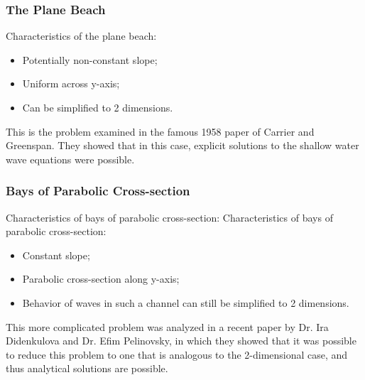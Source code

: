 	\begin{frame}
	\frametitle{The Plane Beach}
		Characteristics of the plane beach:
		\begin{itemize}
			\item Potentially non-constant slope;
			\item Uniform across y-axis;
			\item Can be simplified to 2 dimensions.
		\end{itemize}
		This is the problem examined in the famous 1958 paper of Carrier and Greenspan. They showed that in this case, explicit solutions to the shallow water wave equations were possible.
	\end{frame}


	\begin{frame}
		\frametitle{Bays of Parabolic Cross-section}
		Characteristics of bays of parabolic cross-section:
		Characteristics of bays of parabolic cross-section:
		\begin{itemize}
			\item Constant slope;
			\item Parabolic cross-section along y-axis;
			\item Behavior of waves in such a channel can still be simplified to 2 dimensions.
		\end{itemize}
		This more complicated problem was analyzed in a recent paper by Dr. Ira Didenkulova and Dr. Efim Pelinovsky, in which they showed that it was possible to reduce this problem to one that is analogous to the 2-dimensional case, and thus analytical solutions are possible.
	\end{frame}

